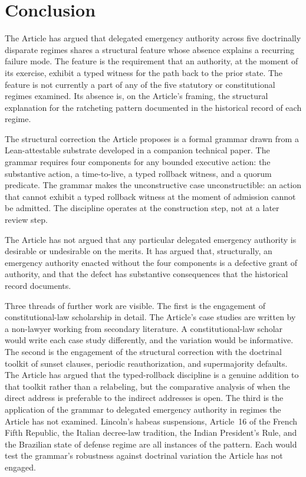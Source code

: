 \section{Conclusion}
\label{sec:conclusion}

The Article has argued that delegated emergency authority across five doctrinally disparate regimes shares
a structural feature whose absence explains a recurring failure mode.
The feature is the requirement that an authority, at the moment of its exercise, exhibit a typed witness
for the path back to the prior state.
The feature is not currently a part of any of the five statutory or constitutional regimes examined.
Its absence is, on the Article's framing, the structural explanation for the ratcheting pattern documented
in the historical record of each regime.

The structural correction the Article proposes is a formal grammar drawn from a Lean-attestable substrate
developed in a companion technical paper.
The grammar requires four components for any bounded executive action:
the substantive action,
a time-to-live,
a typed rollback witness, and
a quorum predicate.
The grammar makes the unconstructive case unconstructible:
an action that cannot exhibit a typed rollback witness at the moment of admission cannot be admitted.
The discipline operates at the construction step, not at a later review step.

The Article has not argued that any particular delegated emergency authority is desirable or undesirable on the merits.
It has argued that, structurally, an emergency authority enacted without the four components is a defective grant of authority,
and that the defect has substantive consequences that the historical record documents.

Three threads of further work are visible.
The first is the engagement of constitutional-law scholarship in detail.
The Article's case studies are written by a non-lawyer working from secondary literature.
A constitutional-law scholar would write each case study differently, and the variation would be informative.
The second is the engagement of the structural correction with the doctrinal toolkit of sunset clauses,
periodic reauthorization, and supermajority defaults.
The Article has argued that the typed-rollback discipline is a genuine addition to that toolkit rather than a relabeling,
but the comparative analysis of when the direct address is preferable to the indirect addresses is open.
The third is the application of the grammar to delegated emergency authority in regimes the Article has not
examined.
Lincoln's habeas suspensions, Article~16 of the French Fifth Republic, the Italian decree-law tradition,
the Indian President's Rule, and the Brazilian state of defense regime are all instances of the pattern.
Each would test the grammar's robustness against doctrinal variation the Article has not engaged.

